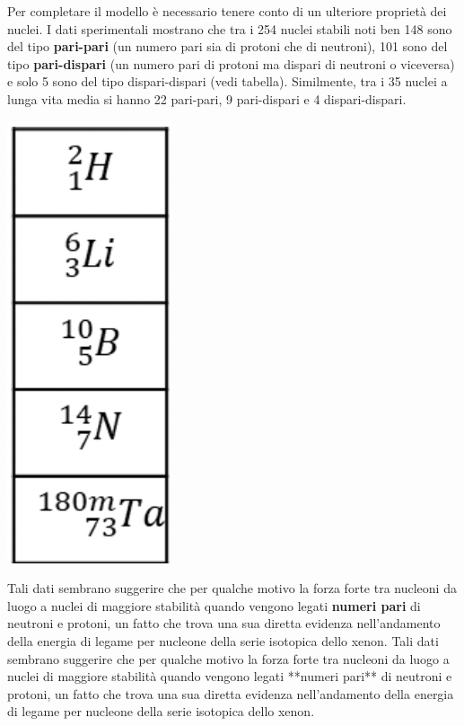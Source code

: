 Per completare il modello è necessario tenere conto di un ulteriore
proprietà dei nuclei.
I dati sperimentali mostrano che tra i 254 nuclei
stabili noti ben 148 sono del tipo \textbf{pari-pari} (un numero pari
sia di protoni che di neutroni), 101 sono del tipo \textbf{pari-dispari}
(un numero pari di protoni ma dispari di neutroni o viceversa) e solo 5
sono del tipo dispari-dispari (vedi tabella).
Similmente, tra i 35
nuclei a lunga vita media si hanno 22 pari-pari, 9 pari-dispari e 4
dispari-dispari.
\begin{marginfigure}
	\centering
	\includegraphics[height = 0.35 \textheight]{figs/goccia4}
	\label{fig:goccia4}
\end{marginfigure}
Tali dati sembrano suggerire che per qualche motivo la forza forte tra
nucleoni da luogo a nuclei di maggiore stabilità quando vengono legati
\textbf{numeri pari} di neutroni e protoni, un fatto che trova una sua
diretta evidenza nell'andamento della energia di legame per nucleone
della serie isotopica dello xenon.
Tali dati sembrano suggerire che per qualche motivo la forza forte tra nucleoni da luogo a nuclei di maggiore stabilità quando vengono legati **numeri pari** di neutroni e protoni, un fatto che trova una sua diretta evidenza nell’andamento della energia di legame per nucleone della serie isotopica dello xenon.
